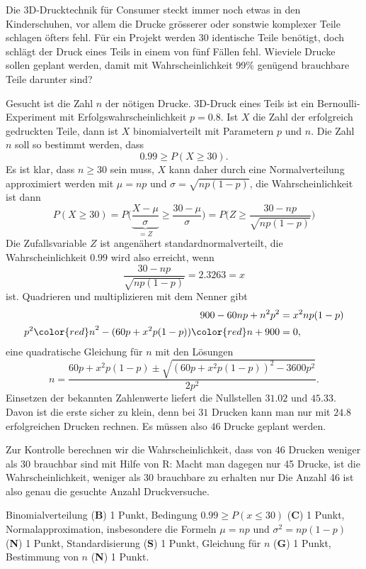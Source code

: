 Die 3D-Drucktechnik für Consumer steckt immer noch etwas in den 
Kinderschuhen, vor allem die Drucke grösserer oder sonstwie komplexer
Teile schlagen öfters fehl.
Für ein Projekt werden 30 identische Teile benötigt,
doch schlägt der Druck eines Teils in einem von fünf Fällen fehl.
Wieviele Drucke sollen geplant werden, damit mit Wahrscheinlichkeit 99\%
genügend brauchbare Teile darunter sind?


\begin{loesung}
Gesucht ist die Zahl $n$ der nötigen Drucke.
3D-Druck eines Teils ist ein Bernoulli-Experiment mit
Erfolgswahrscheinlichkeit $p=0.8$.
Ist $X$ die Zahl der erfolgreich gedruckten Teile, dann ist $X$
binomialverteilt mit Parametern $p$ und $n$.
Die Zahl $n$ soll so bestimmt werden, dass 
\[
0.99 \ge P(X\ge 30).
\]
Es ist klar, dass $n\ge 30$ sein muss, $X$ kann daher durch eine
Normalverteilung approximiert werden mit $\mu=np$ und $\sigma=\sqrt{np(1-p)}$,
die Wahrscheinlichkeit ist dann
\[
P(X\ge 30)=P\biggl(
\underbrace{\frac{X-\mu}{\sigma}}_{=Z}\ge\frac{30-\mu}{\sigma}
\biggr)
=P\biggl(Z\ge \frac{30-np}{\sqrt{np(1-p)}}\biggr)
\]
Die Zufallsvariable $Z$ ist angenähert standardnormalverteilt, die
Wahrscheinlichkeit $0.99$ wird also erreicht, wenn 
\[
\frac{30-np}{\sqrt{np(1-p)}} = 2.3263=x
\]
ist.
Quadrieren und multiplizieren mit dem Nenner gibt
\begin{align*}
900-60np+n^2p^2
&=
x^2 np(1-p)
\\
p^2{\color{red}n}^2-(60p+x^2p(1-p)){\color{red}n}+900&=0,
\end{align*}
eine quadratische Gleichung für $n$ mit den Lösungen
\[
n=\frac{60p+x^2p(1-p)\pm\sqrt{(60p+x^2p(1-p))^2 - 3600p^2}}{2p^2}.
\]
Einsetzen der bekannten Zahlenwerte liefert die Nullstellen $31.02$ und $45.33$.
Davon ist die erste sicher zu klein, denn bei $31$ Drucken kann man nur mit $24.8$ erfolgreichen Drucken rechnen.
Es müssen also $46$ Drucke geplant werden.

Zur Kontrolle berechnen wir die Wahrscheinlichkeit, dass von 46 Drucken
weniger als 30 brauchbar sind mit Hilfe von R:
Macht man dagegen nur 45 Drucke, ist die Wahrscheinlichkeit, weniger als
30 brauchbare zu erhalten nur
Die Anzahl 46 ist also genau die gesuchte Anzahl Druckversuche.
\end{loesung}


\begin{bewertung}
Binomialverteilung ({\bf B}) 1 Punkt,
Bedingung $0.99 \ge P(x\le 30)$ ({\bf C}) 1 Punkt,
Normalapproximation, insbesondere die Formeln $\mu=np$ und $\sigma^2=np(1-p)$
({\bf N}) 1 Punkt,
Standardisierung ({\bf S}) 1 Punkt,
Gleichung für $n$ ({\bf G}) 1 Punkt,
Bestimmung von $n$ ({\bf N}) 1 Punkt.
\end{bewertung}

